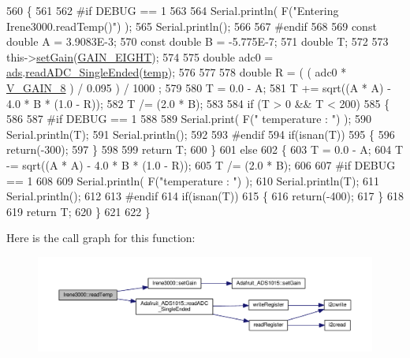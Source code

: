 \begin{DoxyCode}
560 \{
561 
562 \textcolor{preprocessor}{#if DEBUG == 1 }
563 
564     Serial.println( F(\textcolor{stringliteral}{"Entering Irene3000.readTemp()"}) );
565     Serial.println();
566 
567 \textcolor{preprocessor}{#endif}
568 
569     \textcolor{keyword}{const} \textcolor{keywordtype}{double} A = 3.9083E-3;
570     \textcolor{keyword}{const} \textcolor{keywordtype}{double} B = -5.775E-7;
571     \textcolor{keywordtype}{double} T;
572 
573     this->\hyperlink{class_irene3000_aff7c5da186b388e7272e63ff88a20c34}{setGain}(\hyperlink{_cool_adafruit___a_d_s1015_8h_a3d6c0e15829a207b9155890811fa4781af284da818fc21db27c5ffcfaff7047cb}{GAIN\_EIGHT});
574 
575     \textcolor{keywordtype}{double} adc0 = \hyperlink{class_irene3000_a1215e77ba761c9908d80d691f149e135}{ads}.\hyperlink{class_adafruit___a_d_s1015_a40f38b9e1f3ec397c0670dd632510235}{readADC\_SingleEnded}(\hyperlink{_irene3000_8h_a5905d48604152cf57aa6bfa087b49173}{temp});
576 
577 
578     \textcolor{keywordtype}{double} R = ( ( adc0 * \hyperlink{_irene3000_8h_ab7ab16df599d3f0ce29e12791a504891}{V\_GAIN\_8} ) / 0.095 ) / 1000 ;
579 
580     T = 0.0 - A;
581     T += sqrt((A * A) - 4.0 * B * (1.0 - R));
582     T /= (2.0 * B);
583 
584     \textcolor{keywordflow}{if} (T > 0 && T < 200) 
585     \{
586 
587 \textcolor{preprocessor}{    #if DEBUG == 1 }
588 
589         Serial.print( F(\textcolor{stringliteral}{" temperature : "}) );
590         Serial.println(T);
591         Serial.println();
592     
593 \textcolor{preprocessor}{    #endif }
594         \textcolor{keywordflow}{if}(isnan(T))
595         \{
596             \textcolor{keywordflow}{return}(-300);           
597         \}
598 
599         \textcolor{keywordflow}{return} T;
600     \}
601     \textcolor{keywordflow}{else} 
602     \{
603         T = 0.0 - A;
604         T -= sqrt((A * A) - 4.0 * B * (1.0 - R));
605         T /= (2.0 * B);
606     
607 \textcolor{preprocessor}{    #if DEBUG == 1 }
608     
609         Serial.println( F(\textcolor{stringliteral}{"temperature : "}) );
610         Serial.println(T);
611         Serial.println();
612     
613 \textcolor{preprocessor}{    #endif}
614         \textcolor{keywordflow}{if}(isnan(T))
615         \{
616             \textcolor{keywordflow}{return}(-400);           
617         \}
618 
619         \textcolor{keywordflow}{return} T;
620     \}
621 
622 \}
\end{DoxyCode}
Here is the call graph for this function\+:\nopagebreak
\begin{figure}[H]
\begin{center}
\leavevmode
\includegraphics[width=350pt]{d6/d03/class_irene3000_a80bc6dfea106dc3bc54fa20204d4d5dc_cgraph}
\end{center}
\end{figure}
